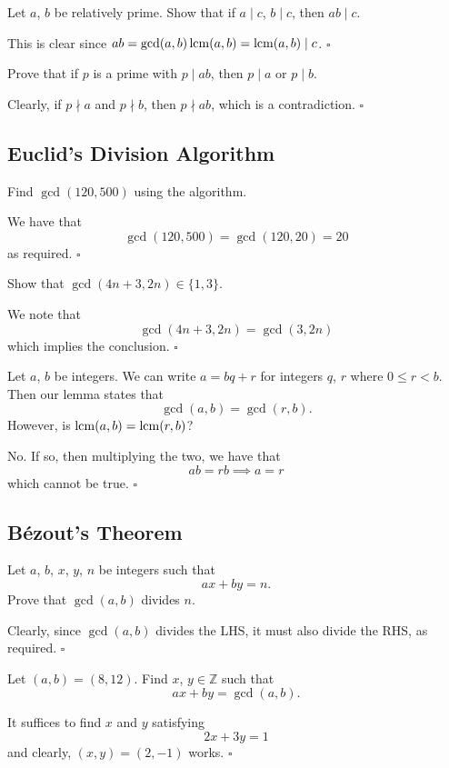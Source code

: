 \documentclass{article}
\begin{document}
\begin{problem}[1.6.3]{}
Let $a$, $b$ be relatively prime. Show that if $a \mid c$, $b \mid c$, then $ab \mid c$.
\end{problem}
This is clear since $ab = \gcd(a,b)\operatorname{lcm}(a,b) = \operatorname{lcm}(a,b) \mid c$. $\square$

\begin{problem}[1.6.4]{}
Prove that if $p$ is a prime with $p \mid ab$, then $p \mid a$ or $p \mid b$.
\end{problem}
Clearly, if $p \nmid a$ and $p \nmid b$, then $p \nmid ab$, which is a contradiction. $\square$

\subsection{Euclid's Division Algorithm}

\begin{problem}[1.7.1]{}
Find $\gcd(120, 500)$ using the algorithm.
\end{problem}
We have that \[\gcd(120, 500) = \gcd(120, 20) = \boxed{20}\] as required. $\square$

\begin{problem}[1.7.2]{}
Show that $\gcd(4n + 3, 2n) \in \{1, 3\}$.
\end{problem}
We note that \[\gcd(4n+3, 2n) = \gcd(3, 2n)\] which implies the conclusion. $\square$

\begin{problem}[1.7.3]{}
Let $a$, $b$ be integers. We can write $a = bq + r$ for integers $q$, $r$ where $0 \le r < b$. Then our lemma states that \[\gcd(a, b) = \gcd(r, b).\] However, is $\operatorname{lcm}(a, b) = \operatorname{lcm}(r, b)$?
\end{problem}
No. If so, then multiplying the two, we have that \[ab = rb \implies a = r\] which cannot be true. $\square$

\subsection{B\'ezout's Theorem}

\begin{problem}[1.8.1]{}
Let $a$, $b$, $x$, $y$, $n$ be integers such that \[ax + by = n.\] Prove that $\gcd(a, b)$ divides $n$.
\end{problem}
Clearly, since $\gcd(a, b)$ divides the LHS, it must also divide the RHS, as required. $\square$

\begin{problem}[1.8.2]{}
Let $(a, b) = (8, 12)$. Find $x$, $y \in \mathbb{Z}$ such that \[ax + by = \gcd(a, b).\]
\end{problem}
It suffices to find $x$ and $y$ satisfying \[2x+3y=1\] and clearly, $(x, y) = \boxed{(2, -1)}$ works. $\square$
\end{document}
